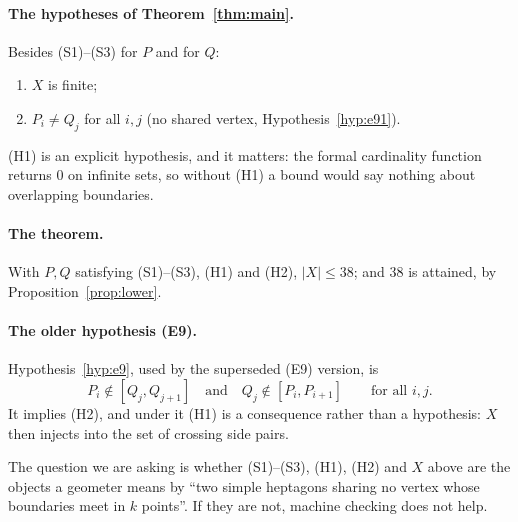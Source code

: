\documentclass[11pt,a4paper]{article}
\theoremstyle{plain}
\theoremstyle{definition}
\theoremstyle{remark}
\begin{document}
\paragraph{The hypotheses of Theorem~\ref{thm:main}.} Besides (S1)--(S3) for
$P$ and for $Q$:
\begin{enumerate}[label=(H\arabic*),leftmargin=*,nosep]
  \item $X$ is finite;
  \item $P_i\ne Q_j$ for all $i,j$ \quad(no shared vertex,
    Hypothesis~\ref{hyp:e91}).
\end{enumerate}
(H1) is an explicit hypothesis, and it matters: the formal cardinality function
returns $0$ on infinite sets, so without (H1) a bound would say nothing about
overlapping boundaries.

\paragraph{The theorem.} With $P,Q$ satisfying (S1)--(S3), (H1) and (H2),
$\lvert X\rvert\le 38$; and $38$ is attained, by Proposition~\ref{prop:lower}.

\paragraph{The older hypothesis (E9).} Hypothesis~\ref{hyp:e9}, used by the
superseded (E9) version, is
\[
  P_i \notin [Q_j,Q_{j+1}]
  \quad\text{and}\quad
  Q_j \notin [P_i,P_{i+1}]
  \qquad\text{for all } i,j .
\]
It implies (H2), and under it (H1) is a consequence rather than a hypothesis:
$X$ then injects into the set of crossing side pairs.

\medskip
\noindent
The question we are asking is whether (S1)--(S3), (H1), (H2) and $X$ above are
the objects a geometer means by ``two simple heptagons sharing no vertex whose
boundaries meet in $k$ points''. If they are not, machine checking does not
help.



\end{document}

